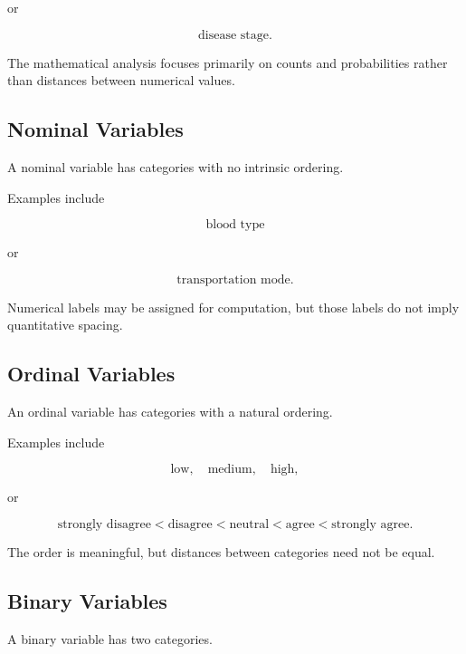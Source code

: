 or

\[
\boxed{
\text{disease stage}.
}
\]

The mathematical analysis focuses primarily on counts and probabilities
rather than distances between numerical values.

\subsection{Nominal Variables}
\label{subsec:nominal-variables}

A nominal variable has categories with no intrinsic ordering.

Examples include

\[
\boxed{
\text{blood type}
}
\]

or

\[
\boxed{
\text{transportation mode}.
}
\]

Numerical labels may be assigned for computation, but those labels do not
imply quantitative spacing.

\subsection{Ordinal Variables}
\label{subsec:ordinal-variables}

An ordinal variable has categories with a natural ordering.

Examples include

\[
\boxed{
\text{low},
\quad
\text{medium},
\quad
\text{high},
}
\]

or

\[
\boxed{
\text{strongly disagree}
<
\text{disagree}
<
\text{neutral}
<
\text{agree}
<
\text{strongly agree}.
}
\]

The order is meaningful, but distances between categories need not be
equal.

\subsection{Binary Variables}
\label{subsec:binary-variables}

A binary variable has two categories.

